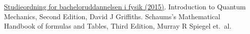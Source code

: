 \documentclass[danish,a4paper,oneside,onecolumn,article,11pt]{memoir}
\begin{document}
\begin{thebibliography}{99}
 \href{https://mit.au.dk/EDDI/webservices/DokOrdningService.cfc?method=visGodkendtOrdning&dokOrdningId=10727&sprog=da}{Studieordning for bacheloruddannelsen i fysik
  (2015)}.
 Introduction to Quantum Mechanics, Second Edition, David J Griffiths.
 Schaums's Mathematical Handbook of formulas and Tables, Third Edition, Murray R Spiegel et.~al.
\end{thebibliography}
\end{document}
